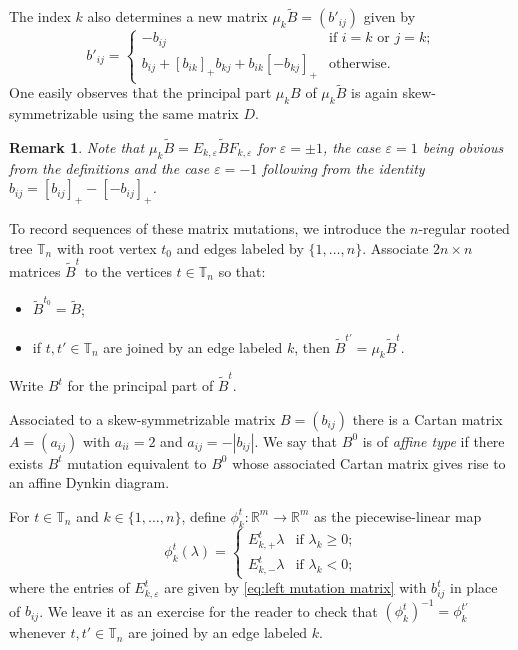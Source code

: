\documentclass{amsart}
\newtheorem{remark}[theorem]{Remark}
\numberwithin{theorem}{section}
\newcommand{\RR}{\mathbb{R}}
\newcommand{\TT}{\mathbb{T}}
\begin{document}
  The index $k$ also determines a new matrix $\mu_k \tilde{B}=(b'_{ij})$ given by
  \begin{equation}
    \label{eq:matrix mutation}
    b'_{ij}=\begin{cases} -b_{ij} & \text{if $i=k$ or $j=k$;}\\ b_{ij}+[b_{ik}]_+b_{kj}+b_{ik}[-b_{kj}]_+ & \text{otherwise.} \end{cases}
  \end{equation}
  One easily observes that the principal part $\mu_k B$ of $\mu_k \tilde{B}$ is again skew-symmetrizable using the same matrix $D$.
  \begin{remark}
    Note that $\mu_k \tilde B=E_{k,\varepsilon} \tilde B F_{k,\varepsilon}$ for $\varepsilon=\pm 1$, the case $\varepsilon=1$ being obvious from the definitions and the case $\varepsilon=-1$ following from the identity $b_{ij}=[b_{ij}]_+-[-b_{ij}]_+$.
  \end{remark}

  To record sequences of these matrix mutations, we introduce the $n$-regular rooted tree $\TT_n$ with root vertex $t_0$ and edges labeled by $\{1,\ldots,n\}$.
  Associate $2n\times n$ matrices $\tilde{B}^t$ to the vertices $t\in\TT_n$ so that:
  \begin{itemize}
    \item $\tilde{B}^{t_0}=\tilde{B}$;
    \item if $t,t'\in\TT_n$ are joined by an edge labeled $k$, then $\tilde{B}^{t'}=\mu_k \tilde{B}^t$.
  \end{itemize}
  Write $B^t$ for the principal part of $\tilde B^t$.

  Associated to a skew-symmetrizable matrix $B=(b_{ij})$ there is a Cartan matrix $A=(a_{ij})$ with $a_{ii}=2$ and $a_{ij}=-|b_{ij}|$.
  We say that $B^0$ is of \emph{affine type} if there exists $B^t$ mutation equivalent to $B^0$ whose associated Cartan matrix gives rise to an affine Dynkin diagram.

  For $t\in\TT_n$ and $k\in\{1,\ldots,n\}$, define $\phi^t_k:\RR^m\to\RR^m$ as the piecewise-linear map
  \[
    \phi^t_k(\lambda)=\begin{cases} E^t_{k,+}\lambda & \text{if $\lambda_k\ge0$;}\\ E^t_{k,-}\lambda & \text{if $\lambda_k<0$;} \end{cases}
  \]
  where the entries of $E^t_{k,\varepsilon}$ are given by \eqref{eq:left mutation matrix} with $b^t_{ij}$ in place of $b_{ij}$.
  We leave it as an exercise for the reader to check that $(\phi^t_k)^{-1}=\phi^{t'}_k$ whenever $t,t'\in\TT_n$ are joined by an edge labeled $k$.
\end{document}
